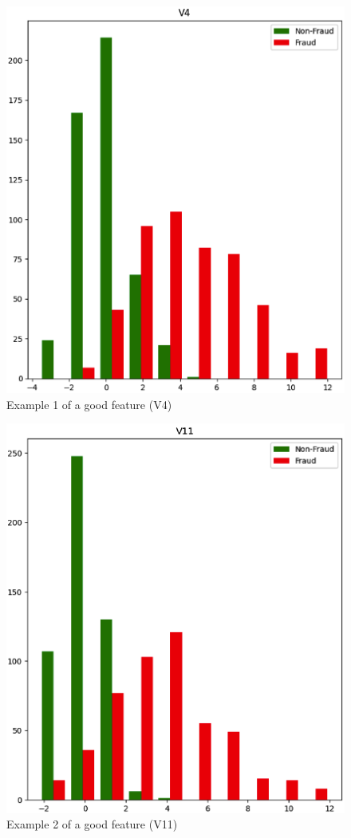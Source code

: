 \documentclass[conference]{IEEEtran}
\begin{document}
\begin{figure}[H]
    \centering
    \includegraphics[width=1\linewidth]{images/feature4histogram.png}
    \caption{Example 1 of a good feature (V4)}
    \label{fig:enter-label}
\end{figure}

\begin{figure}[H]
    \centering
    \includegraphics[width=1\linewidth]{images/feature11histogram.png}
    \caption{Example 2 of a good feature (V11)}
    \label{fig:enter-label}
\end{figure}
\end{document}
